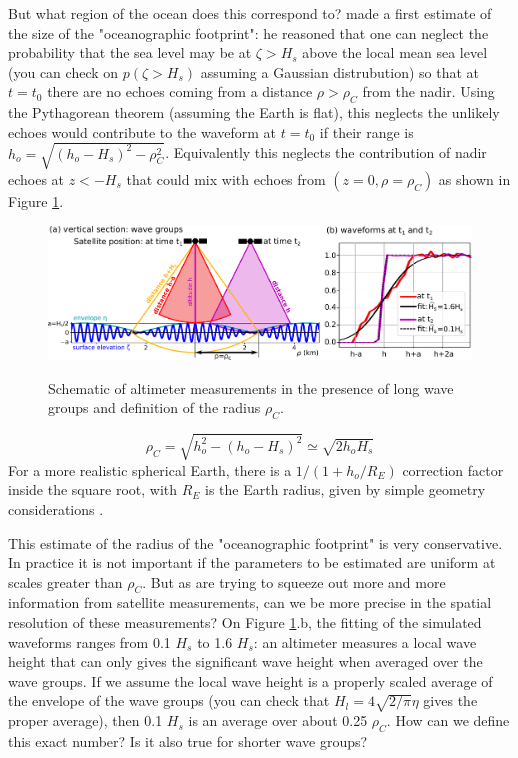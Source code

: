 But what region of the ocean does this correspond to? \cite{Chelton&al.1989} made a first estimate of the size of the "oceanographic footprint": he reasoned that one can neglect the probability that the sea level may be at $\zeta > H_s$ above the local mean sea level (you can check on $p(\zeta > H_s)$ assuming a Gaussian distrubution)  so that at $t=t_0$ there are no echoes coming from a distance $\rho > \rho_C$ from the nadir.  Using the Pythagorean theorem (assuming the Earth is flat), this neglects the unlikely echoes would contribute to the waveform at $t=t_0$ if their range is $h_o=\sqrt{(h_o-H_s)^2-\rho_C^2}$.  Equivalently this neglects the contribution of nadir echoes at $z< -H_s$ that could mix with echoes from $(z=0,\rho=\rho_C)$ as shown in Figure \ref{fig:group_alti}.
\begin{figure}[htb]
\centerline{\includegraphics[width=\textwidth]{FIGS_CH_SAT/wave_group_schematic.pdf}}
  \caption{Schematic of altimeter measurements in the presence of long wave groups and definition of the \cite{Chelton&al.1989} radius $\rho_C$.}{} \label{fig:group_alti}
\end{figure}
\begin{equation}
    \rho_C =\sqrt{h_o^2- (h_o-H_s)^2} \simeq \sqrt{ 2 h_o H_s} \label{eq:rC} 
\end{equation}
For a more realistic spherical Earth, there is a $1/(1+h_o/R_E)$ correction factor inside the square root, with $R_E$ is the Earth radius, given by simple geometry considerations  \citep{Chelton&al.1989}.

This estimate of the radius of the "oceanographic footprint" is very conservative. In practice it is not important if the parameters to be estimated are uniform at scales greater than $\rho_C$. But as are trying to squeeze out more and more information from satellite measurements, can we be more precise in the spatial resolution of these measurements?  On Figure \ref{fig:group_alti}.b, the fitting of the simulated waveforms ranges from 0.1 $H_s$ to 1.6 $H_s$: an altimeter measures a local wave height that can only gives the significant wave height when averaged over the wave groups. If we assume the local wave height is a properly scaled average of the envelope of the wave groups (you can check that $H_l=4\sqrt{2/\pi} \eta$ gives the proper average), then 0.1  $H_s$  is an average over about 0.25 $\rho_C$. How can we define this exact number? Is it also true for shorter wave groups? 



